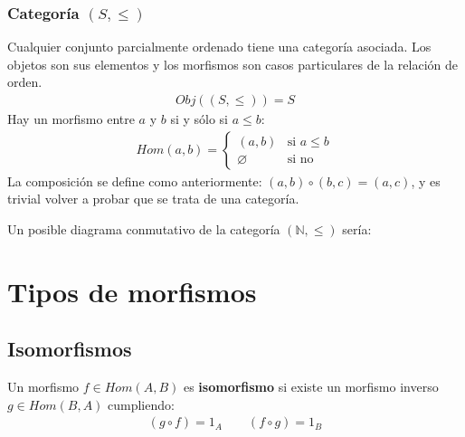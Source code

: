 \documentclass[a4paper, 11pt]{amsart}
\let\emptyset\varnothing
\newcommand{\twopartdef}[4]
{
	\left\{
		\begin{array}{ll}
			#1 & \mbox{si } #2 \\
			#3 & \mbox{si } #4
		\end{array}
	\right.
}
\theoremstyle{definition}
\theoremstyle{remark}
\numberwithin{equation}{section}
\begin{document}
    \subsubsection{Categoría \texttt{$(S,\leq)$}}
      Cualquier conjunto parcialmente ordenado tiene una categoría asociada. Los objetos
      son sus elementos y los morfismos son casos particulares de la relación de orden.
      \begin{gather*}
        Obj((S,\leq)) = S
      \end{gather*}
      Hay un morfismo entre $a$ y $b$ si y sólo si $a \leq b$:
      \begin{align*}
        Hom(a,b)= \twopartdef{(a,b)}{a \leq b}{\emptyset}{\mbox{no}}
      \end{align*}
      La composición se define como anteriormente: $(a,b) \circ (b,c) = (a,c)$, y es
      trivial volver a probar que se trata de una categoría.
      \medskip
      
      Un posible diagrama conmutativo de la categoría \texttt{$(\mathbb{N},\leq)$} sería:
      \begin{center}
      \end{center}
    
\newpage
\section {Tipos de morfismos}
  \subsection {Isomorfismos}
     Un morfismo $f \in Hom(A,B)$ es \textbf{isomorfismo} si existe un morfismo inverso
    $g \in Hom(B,A)$ cumpliendo:
    \begin{gather*}
     (g \circ f) = 1_A \qquad (f \circ g) = 1_B
    \end{gather*}
\end{document}
